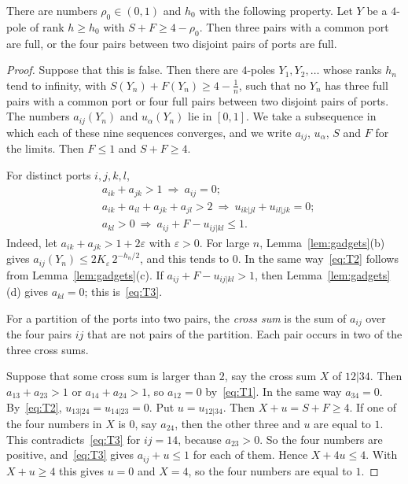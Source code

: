 \begin{lemma}[Rigidity]\label{lem:rigid}
There are numbers $\rho_0\in(0,1)$ and $h_0$ with the following property. Let $Y$ be a $4$-pole
of rank $h\ge h_0$ with $S+F\ge4-\rho_0$. Then three pairs with a common port are full, or the
four pairs between two disjoint pairs of ports are full.
\end{lemma}

\begin{proof}
Suppose that this is false. Then there are $4$-poles $Y_1,Y_2,\dots$ whose ranks $h_n$ tend to
infinity, with $S(Y_n)+F(Y_n)\ge4-\frac1n$, such that no $Y_n$ has three full pairs with a common
port or four full pairs between two disjoint pairs of ports. The numbers $a_{ij}(Y_n)$ and
$u_\alpha(Y_n)$ lie in $[0,1]$. We take a subsequence in which each of these nine sequences
converges, and we write $a_{ij}$, $u_\alpha$, $S$ and $F$ for the limits. Then $F\le1$ and
$S+F\ge4$.

 For distinct ports $i,j,k,l$,
\begin{align}
  &a_{ik}+a_{jk}>1\ \Longrightarrow\ a_{ij}=0;\label{eq:T1}\\
  &a_{ik}+a_{il}+a_{jk}+a_{jl}>2\ \Longrightarrow\ u_{ik|jl}+u_{il|jk}=0;\label{eq:T2}\\
  &a_{kl}>0\ \Longrightarrow\ a_{ij}+F-u_{ij|kl}\le1.\label{eq:T3}
\end{align}
Indeed, let $a_{ik}+a_{jk}>1+2\varepsilon$ with $\varepsilon>0$. For large $n$,
Lemma~\ref{lem:gadgets}(b) gives $a_{ij}(Y_n)\le2K_\varepsilon\,2^{-h_n/2}$, and this tends to
$0$. In the same way~\eqref{eq:T2} follows from Lemma~\ref{lem:gadgets}(c). If
$a_{ij}+F-u_{ij|kl}>1$, then Lemma~\ref{lem:gadgets}(d) gives $a_{kl}=0$; this
is~\eqref{eq:T3}.

 For a partition of the ports into two pairs, the \emph{cross sum} is the sum of
$a_{ij}$ over the four pairs $ij$ that are not pairs of the partition. Each pair occurs in two of
the three cross sums.

Suppose that some cross sum is larger than $2$, say the cross sum $X$ of $12|34$. Then
$a_{13}+a_{23}>1$ or $a_{14}+a_{24}>1$, so $a_{12}=0$ by~\eqref{eq:T1}. In the same way
$a_{34}=0$. By~\eqref{eq:T2}, $u_{13|24}=u_{14|23}=0$. Put $u=u_{12|34}$. Then $X+u=S+F\ge4$.
If one of the four numbers in $X$ is $0$, say $a_{24}$, then the other three and $u$ are equal
to $1$. This contradicts~\eqref{eq:T3} for $ij=14$, because $a_{23}>0$. So the four numbers are
positive, and~\eqref{eq:T3} gives $a_{ij}+u\le1$ for each of them. Hence $X+4u\le4$. With
$X+u\ge4$ this gives $u=0$ and $X=4$, so the four numbers are equal to $1$.


\end{proof}
